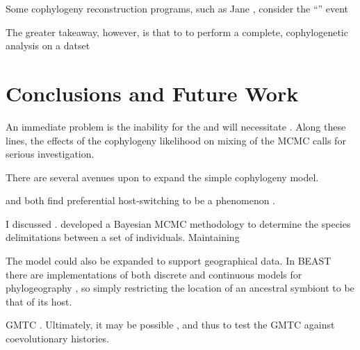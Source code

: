 \documentclass[12pt,letterpaper]{article}
\begin{document}
Some cophylogeny reconstruction programs, such as Jane \parencite{Conow:2010}, consider the \enquote{} event

The greater takeaway, however, is that to to perform a complete, cophylogenetic analysis on a datset

\section*{Conclusions and Future Work}

An immediate problem is the inability for the and will necessitate . Along these lines, the effects of the cophylogeny likelihood on mixing of the \ac{MCMC} calls for serious investigation. 

There are several avenues upon to expand the simple cophylogeny model. 

\textcite{Charleston:2002} and \textcite{Faria:2013} both find preferential host-switching to be a phenomenon . 

I discussed . \textcite{Yang:2010} developed a Bayesian \ac{MCMC} methodology to determine the species delimitations between a set of individuals. Maintaining 

The model could also be expanded to support geographical data. In BEAST there are implementations of both discrete and continuous models for phylogeography \parencites{Lemey:2009}{Lemey:2010}, so simply restricting the location of an ancestral symbiont to be that of its host.

\ac{GMTC} . Ultimately, it may be possible , and thus to test the \ac{GMTC} against coevolutionary histories.

\printbibliography
\end{document}
